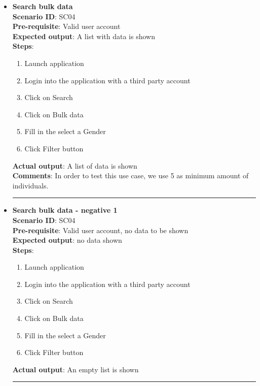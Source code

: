 \documentclass[a4paper, hidelinks, 12pt]{report}
\begin{document}
\begin{itemize}
		\item{\textbf{Search bulk data}} \\
		\textbf{Scenario ID}: SC04 \\
		\textbf{Pre-requisite}: Valid user account \\
		\textbf{Expected output}: A list with data is shown\\
		\textbf{Steps}:
		\begin{enumerate}
			\item{Launch application}
			\item{Login into the application with a third party account}
			\item{Click on Search}
			\item{Click on Bulk data}
			\item{Fill in the select a Gender}
			\item{Click Filter button}
		\end{enumerate}
		\textbf{Actual output}: A list of data is shown\\
		\textbf{Comments}: In order to test this use case, we use 5 as minimum amount of individuals.\\
		\rule{\linewidth}{0.4pt}

		\item{\textbf{Search bulk data - negative 1}} \\
		\textbf{Scenario ID}: SC04 \\
		\textbf{Pre-requisite}: Valid user account, no data to be shown \\
		\textbf{Expected output}: no data shown\\
		\textbf{Steps}:
		\begin{enumerate}
			\item{Launch application}
			\item{Login into the application with a third party account}
			\item{Click on Search}
			\item{Click on Bulk data}
			\item{Fill in the select a Gender}
			\item{Click Filter button}
		\end{enumerate}
		\textbf{Actual output}: An empty list is shown\\
		\rule{\linewidth}{0.4pt}


\end{itemize}
\end{document}
